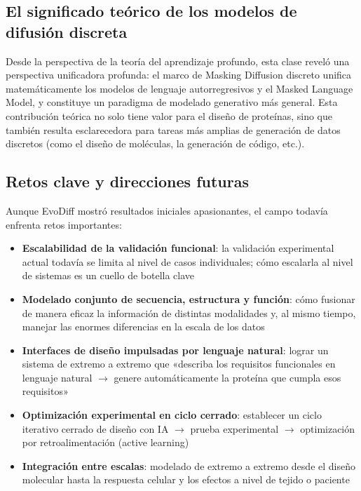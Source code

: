\subsection{El significado teórico de los modelos de difusión discreta}

Desde la perspectiva de la teoría del aprendizaje profundo, esta clase reveló una perspectiva unificadora profunda: el marco de Masking Diffusion discreto unifica matemáticamente los modelos de lenguaje autorregresivos y el Masked Language Model, y constituye un paradigma de modelado generativo más general. Esta contribución teórica no solo tiene valor para el diseño de proteínas, sino que también resulta esclarecedora para tareas más amplias de generación de datos discretos (como el diseño de moléculas, la generación de código, etc.).

\subsection{Retos clave y direcciones futuras}

Aunque EvoDiff mostró resultados iniciales apasionantes, el campo todavía enfrenta retos importantes:

\begin{itemize}
    \item \textbf{Escalabilidad de la validación funcional}: la validación experimental actual todavía se limita al nivel de casos individuales; cómo escalarla al nivel de sistemas es un cuello de botella clave
    \item \textbf{Modelado conjunto de secuencia, estructura y función}: cómo fusionar de manera eficaz la información de distintas modalidades y, al mismo tiempo, manejar las enormes diferencias en la escala de los datos
    \item \textbf{Interfaces de diseño impulsadas por lenguaje natural}: lograr un sistema de extremo a extremo que «describa los requisitos funcionales en lenguaje natural $\rightarrow$ genere automáticamente la proteína que cumpla esos requisitos»
    \item \textbf{Optimización experimental en ciclo cerrado}: establecer un ciclo iterativo cerrado de diseño con IA $\rightarrow$ prueba experimental $\rightarrow$ optimización por retroalimentación (active learning)
    \item \textbf{Integración entre escalas}: modelado de extremo a extremo desde el diseño molecular hasta la respuesta celular y los efectos a nivel de tejido o paciente
\end{itemize}

